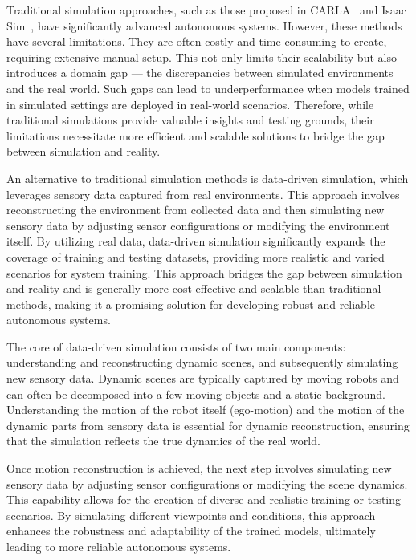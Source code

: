 Traditional simulation approaches, such as those proposed in CARLA~\cite{dosovitskiy2017carla} and Isaac Sim~\cite{makoviychuk2021isaac}, have significantly advanced autonomous systems. However, these methods have several limitations. They are often costly and time-consuming to create, requiring extensive manual setup. This not only limits their scalability but also introduces a domain gap — the discrepancies between simulated environments and the real world. Such gaps can lead to underperformance when models trained in simulated settings are deployed in real-world scenarios. Therefore, while traditional simulations provide valuable insights and testing grounds, their limitations necessitate more efficient and scalable solutions to bridge the gap between simulation and reality.

An alternative to traditional simulation methods is data-driven simulation, which leverages sensory data captured from real environments. This approach involves reconstructing the environment from collected data and then simulating new sensory data by adjusting sensor configurations or modifying the environment itself. By utilizing real data, data-driven simulation significantly expands the coverage of training and testing datasets, providing more realistic and varied scenarios for system training. This approach bridges the gap between simulation and reality and is generally more cost-effective and scalable than traditional methods, making it a promising solution for developing robust and reliable autonomous systems.

The core of data-driven simulation consists of two main components: understanding and reconstructing dynamic scenes, and subsequently simulating new sensory data. Dynamic scenes are typically captured by moving robots and can often be decomposed into a few moving objects and a static background. Understanding the motion of the robot itself (ego-motion) and the motion of the dynamic parts from sensory data is essential for dynamic reconstruction, ensuring that the simulation reflects the true dynamics of the real world.

Once motion reconstruction is achieved, the next step involves simulating new sensory data by adjusting sensor configurations or modifying the scene dynamics. This capability allows for the creation of diverse and realistic training or testing scenarios. By simulating different viewpoints and conditions, this approach enhances the robustness and adaptability of the trained models, ultimately leading to more reliable autonomous systems.

